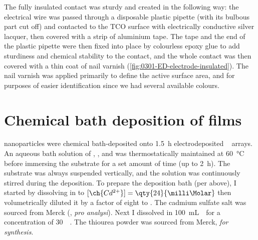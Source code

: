 \documentclass[webedition,openright,titles,swedish,english]{LuaUUThesis}\usepackage[]{graphicx}\usepackage[]{xcolor}
\begin{document}
The fully insulated contact was sturdy and created in the following way:
the electrical wire was passed through
a disposable plastic pipette (with its bulbous part cut off) and contacted to
the \gls{TCO} surface with electrically conductive silver lacquer,
then covered with a strip of aluminium tape.
The tape and the end of the plastic pipette were then fixed into place by
colourless epoxy glue to add sturdiness and chemical stability to the contact,
and the whole contact was then covered with a thin coat of nail varnish (\cref{fig:0301-ED-electrode-insulated}).
The nail varnish was applied primarily to define the active surface area, and
for purposes of easier identification since we had several
available colours.





\section[Chemical bath deposition of CdS films]{\texorpdfstring{Chemical bath deposition of  films}{Chemical bath deposition of CdS films}}
\label{synthesis:chemical-bath-deposition}

 nanoparticles were chemical bath-deposited onto
\qty{1.5}{\hour} electrodeposited \zincox\  arrays.
An aqueous bath solution of ,
, and
 was
thermostatically maintained at \qty{60}{\celsius} before immersing the
substrate for a set amount of time (up to \qty{2}{\hour}).
The substrate was always suspended vertically, and the solution was continuously
stirred during the deposition.
To prepare the deposition bath (per above), I started by dissolving
 in 
to $[\ch{Cd^{2+}}]=\qty{24}{\milli\Molar}$
then volumetrically diluted it by a factor of eight to
.
The cadmium sulfate salt was sourced from Merck (, \emph{pro analysi}).
Next I dissolved  in \qty{100}{\milli\L}~\water\
for a concentration of \qty{30}{\milli\Molar}.
The thiourea powder was sourced from Merck, \emph{for synthesis}.
\end{document}
